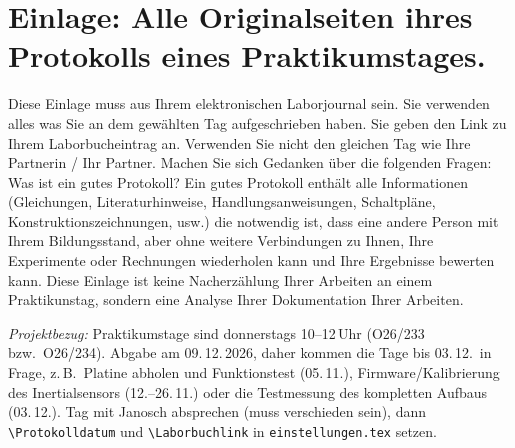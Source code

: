 
\section{Einlage: Alle Originalseiten ihres Protokolls eines Praktikumstages.}
\label{sec:protokoll}

\begin{hinweise}
Diese Einlage muss aus Ihrem elektronischen Laborjournal sein. Sie verwenden alles was Sie an dem gewählten Tag
aufgeschrieben haben. Sie geben den Link zu Ihrem Laborbucheintrag an.
Verwenden Sie nicht den gleichen Tag wie Ihre Partnerin / Ihr Partner. Machen Sie sich Gedanken über die
folgenden Fragen: Was ist ein gutes Protokoll? Ein gutes Protokoll enthält alle Informationen (Gleichungen,
Literaturhinweise, Handlungsanweisungen, Schaltpläne, Konstruktionszeichnungen, usw.) die notwendig ist, dass
eine andere Person mit Ihrem Bildungsstand, aber ohne weitere Verbindungen zu Ihnen, Ihre Experimente oder
Rechnungen wiederholen kann und Ihre Ergebnisse bewerten kann.
Diese Einlage ist keine Nacherzählung Ihrer Arbeiten an einem Praktikunstag, sondern eine Analyse Ihrer
Dokumentation Ihrer Arbeiten.

\smallskip\emph{Projektbezug:} Praktikumstage sind donnerstags 10--12\,Uhr (O26/233 bzw.\ O26/234).
Abgabe am 09.\,12.\,2026, daher kommen die Tage bis 03.\,12.\ in Frage, z.\,B.\ Platine abholen und
Funktionstest (05.\,11.), Firmware/Kalibrierung des Inertialsensors (12.--26.\,11.) oder die Testmessung
des kompletten Aufbaus (03.\,12.). Tag mit Janosch absprechen (muss verschieden sein), dann
\texttt{\textbackslash Protokolldatum} und \texttt{\textbackslash Laborbuchlink} in \texttt{einstellungen.tex}
setzen.
\end{hinweise}

